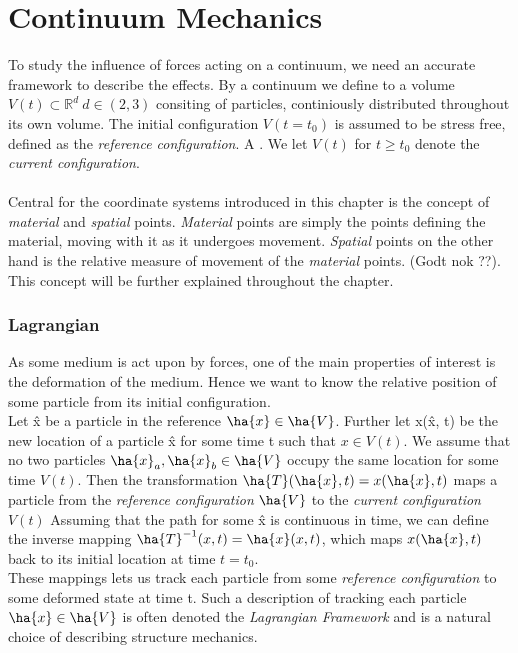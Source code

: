 \chapter{Continuum Mechanics}

To study the influence of forces acting on a continuum, we need an accurate framework to describe the effects. By a continuum we define  to a volume $V(t) \subset \mathbb{R}^d \ d \in (2, 3)$ 
consiting of particles,  continiously distributed throughout its own volume. The initial configuration $V(t = t_0)$  is assumed to be stress free,  defined as the \textit{reference configuration}. A
. We let $V(t)$ for 
$t \geq t_0$ denote the \textit{current configuration}. \\ \\
Central for the coordinate systems introduced in this chapter is the concept of \textit{material} and \textit{spatial} points. \textit{Material} points are simply the points defining the material, moving with it as it undergoes movement. \textit{Spatial} points on the other hand is the relative measure of movement of the \textit{material} points. (Godt nok ??). This concept will be further explained throughout the chapter.

\subsection{Lagrangian}
As some medium is act upon by forces, one of the main properties of interest is the deformation of the medium. Hence we want to know the relative position of some particle from its initial configuration. \\
Let \^{x} be a particle in the reference  $\ha{x} \in \ha{V}$. 
Further let x(\^x, t) be the new location of a particle \^x for some time t such that $x \in V(t)$. We assume that no two particles $\ha{x}_a, \ha{x}_b \in \ha{V}$ occupy the same location for some time $V(t)$.
Then the transformation $\ha{T}(\ha{x}, t) = x(\ha{x}, t)$ maps a particle  from the \textit{reference configuration} $\ha{V}$ to the  \textit{current configuration} $V(t)$
Assuming that the path for some \^{x} is continuous in time, we can define the inverse mapping $\ha{T}^{-1}(x, t) = \ha{x}(x, t)$, which maps $x(\ha{x}, t)$ back to its initial location at time $t = t_0$. \\
These mappings lets us track each particle from some \textit{reference configuration} to some deformed state at time t. 
Such a description of tracking each particle $\ha{x} \in \ha{V}$ is often denoted the \textit{Lagrangian Framework} and is a natural choice of describing structure mechanics. 

